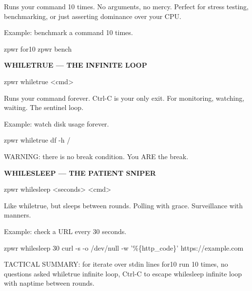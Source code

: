 \documentclass[11pt,a4paper,twoside]{book}
\begin{document}
Runs your command 10 times. No arguments, no mercy. Perfect for stress testing, benchmarking, or just asserting dominance over your CPU.

Example: benchmark a command 10 times.

\begin{codebox}
\color{neongreen}zpwr for10 zpwr bench\\
\end{codebox}


\vspace{12pt}
{\bfseries\color{neonyellow} WHILETRUE — THE INFINITE LOOP}\vspace{4pt}

\begin{codebox}
\color{neongreen}zpwr whiletrue <cmd>\\
\end{codebox}

Runs your command forever. Ctrl-C is your only exit. For monitoring, watching, waiting. The sentinel loop.

Example: watch disk usage forever.

\begin{codebox}
\color{neongreen}zpwr whiletrue df -h /\\
\end{codebox}

WARNING: there is no break condition. You ARE the break.


\vspace{12pt}
{\bfseries\color{neonyellow} WHILESLEEP — THE PATIENT SNIPER}\vspace{4pt}

\begin{codebox}
\color{neongreen}zpwr whilesleep <seconds> <cmd>\\
\end{codebox}

Like whiletrue, but sleeps between rounds. Polling with grace. Surveillance with manners.

Example: check a URL every 30 seconds.

\begin{codebox}
\color{neongreen}zpwr whilesleep 30 curl -s -o /dev/null -w '\%\{http\_code\}' https://example.com\\
\end{codebox}

TACTICAL SUMMARY: for          iterate over stdin lines for10        run 10 times, no questions asked whiletrue    infinite loop, Ctrl-C to escape whilesleep   infinite loop with naptime between rounds.
\end{document}
